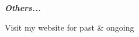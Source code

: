 \documentclass[9pt]{developercv} %
\begin{document}
\begin{minipage}[t]{0.52\textwidth}
     \begin{minipage}[t]{0.28\textwidth}
        \textbf{\textit{Others...}}
    \end{minipage}
    \hfill
    \begin{minipage}[t]{0.70\textwidth}
      Visit my website for past \& ongoing \textcolor{blue}{}
    \end{minipage}
      
\end{minipage}


\vspace{-4 pt}
\end{document}
